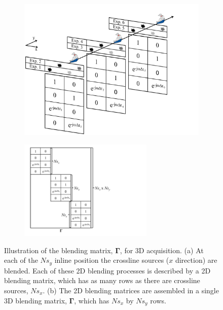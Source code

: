 \begin{figure}

	\begin{subfigure}[t]{0.5\textwidth}
		\centering
		\includegraphics[width = \textwidth]{Plots/DrawingsCartesianFormat1}
		\caption{}
		\label{fig:Ch-Theory-3D-BlendedAcquisition}
	\end{subfigure}
	\begin{subfigure}[t]{0.5\textwidth}
		\centering
		\includegraphics[width = 0.7\textwidth]{Plots/DrawingsCartesianFormat2}
		\caption{}
		\label{fig:Ch-Theory-3D-BlendingMatrix}
	\end{subfigure}
	
	\caption{Illustration of the blending matrix, $\mathbf{\Gamma}$, for 3D acquisition. (a) At each of the $Ns_y$ inline position the crossline sources ($x$ direction) are blended. Each of these 2D blending processes is described by a 2D blending matrix, which has as many rows as there are crossline sources, $Ns_x$. (b) The 2D blending matrices are assembled in a single 3D blending matrix, $\mathbf{\Gamma}$, which has $Ns_x$ by $Ns_y$ rows.}
	\label{fig:Ch-Theory-3D-BlendingMatrix-Design}

\end{figure}

